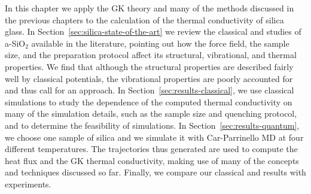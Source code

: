
In this chapter we apply the \abinitio GK theory and many of the methods discussed in the previous chapters to the calculation of the thermal conductivity of silica glass. 
In Section~\ref{sec:silica-state-of-the-art} we review the classical and \abinitio studies of a-SiO$_2$ available in the literature, pointing out how the force field, the sample size, and the preparation protocol affect its structural, vibrational, and thermal properties. 
We find that although the structural properties are described fairly well by classical potentials, the vibrational properties are poorly accounted for and thus call for an \abinitio approach. 
In Section~\ref{sec:results-classical}, we use classical simulations to study the dependence of the computed thermal conductivity on many of the simulation details, such as the sample size and quenching protocol, and to determine the feasibility of \abinitio simulations. 
In Section~\ref{sec:results-quantum}, we choose one sample of silica and we simulate it with Car-Parrinello MD at four different temperatures. The trajectories thus generated are used to compute the \abinitio heat flux and the GK thermal conductivity, making use of many of the concepts and techniques discussed so far. Finally, we compare our classical and \abinitio results with experiments. 



